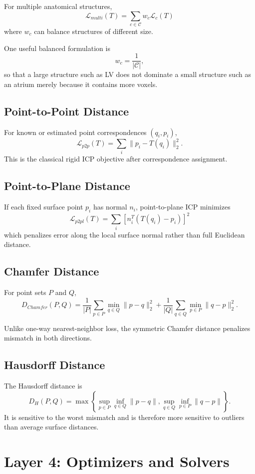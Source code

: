 \documentclass[11pt,a4paper]{article}
\newcommand{\Loss}{\mathcal{L}}
\begin{document}
For multiple anatomical structures,
\[
\boxed{
\Loss_{multi}(T)
=
\sum_{c\in\mathcal{C}}w_c\Loss_c(T)
}
\]
where $w_c$ can balance structures of different size.

One useful balanced formulation is
\[
w_c=\frac{1}{|\mathcal{C}|},
\]
so that a large structure such as LV does not dominate a small structure such as an atrium merely because it contains more voxels.

\subsection{Point-to-Point Distance}

For known or estimated point correspondences $(q_i,p_i)$,
\[
\Loss_{p2p}(T)
=
\sum_i\|p_i-T(q_i)\|_2^2.
\]
This is the classical rigid ICP objective after correspondence assignment.

\subsection{Point-to-Plane Distance}

If each fixed surface point $p_i$ has normal $n_i$, point-to-plane ICP minimizes
\[
\boxed{
\Loss_{p2pl}(T)
=
\sum_i
\left[
 n_i^T(T(q_i)-p_i)
\right]^2
}
\]
which penalizes error along the local surface normal rather than full Euclidean distance.

\subsection{Chamfer Distance}

For point sets $P$ and $Q$,
\[
D_{Chamfer}(P,Q)
=
\frac{1}{|P|}\sum_{p\in P}\min_{q\in Q}\|p-q\|_2^2
+
\frac{1}{|Q|}\sum_{q\in Q}\min_{p\in P}\|q-p\|_2^2.
\]

Unlike one-way nearest-neighbor loss, the symmetric Chamfer distance penalizes mismatch in both directions.

\subsection{Hausdorff Distance}

The Hausdorff distance is
\[
D_H(P,Q)
=
\max\left\{
\sup_{p\in P}\inf_{q\in Q}\|p-q\|,
\sup_{q\in Q}\inf_{p\in P}\|q-p\|
\right\}.
\]
It is sensitive to the worst mismatch and is therefore more sensitive to outliers than average surface distances.

\section{Layer 4: Optimizers and Solvers}
\end{document}
